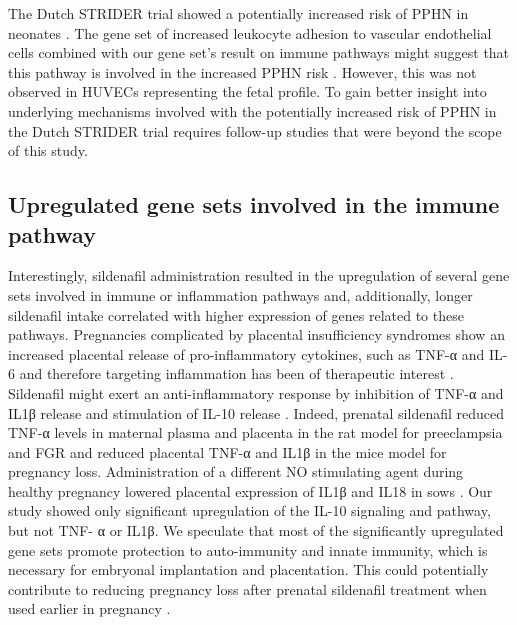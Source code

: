 \documentclass[authordate, empirical]{jote-new-article}
\begin{document}
	The Dutch STRIDER trial showed a potentially increased risk of PPHN in neonates \parencites{Pels2020}. The gene set of increased leukocyte adhesion to vascular endothelial cells combined with our gene set's result on immune pathways might suggest that this pathway is involved in the increased PPHN risk \parencites{Rafikov2019}{Kuebler2018}{Chami2012}{Kobayashi2004}. However, this was not observed in HUVECs representing the fetal profile. To gain better insight into underlying mechanisms involved with the potentially increased risk of PPHN in the Dutch STRIDER trial requires follow-up studies that were beyond the scope of this study.







	\subsection{Upregulated gene sets involved in the immune pathway }



Interestingly, sildenafil administration resulted in the upregulation of several gene sets involved in immune or inflammation pathways and, additionally, longer sildenafil intake correlated with higher expression of genes related to these pathways. Pregnancies complicated by placental insufficiency syndromes show an increased placental release of pro-inflammatory cytokines, such as TNF-α and IL-6 and therefore targeting inflammation has been of therapeutic interest \parencites{George2011}{Oyston2015}{Kniotek2017}. Sildenafil might exert an anti-inflammatory response by inhibition of TNF-α and IL1β release and stimulation of IL-10 release \parencites{Ribaudo2016}{Kniotek2017}. Indeed, prenatal sildenafil reduced TNF-α levels in maternal plasma and placenta in the rat model for preeclampsia and FGR \parencites{Gillis2016} and reduced placental TNF-α and IL1β in the mice model for pregnancy loss. Administration of a different NO stimulating agent during healthy pregnancy lowered placental expression of IL1β and IL18 in sows \parencites{Luo2019}. Our study showed only significant upregulation of the IL-10 signaling and pathway, but not TNF- α or IL1β. We speculate that most of the significantly upregulated gene sets promote protection to auto-immunity and innate immunity, which is necessary for embryonal implantation and placentation. This could potentially contribute to reducing pregnancy loss after prenatal sildenafil treatment when used earlier in pregnancy \parencites{Luna2015}.
\end{document}
